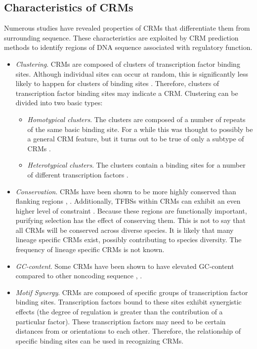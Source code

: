 \documentclass{frontiersENG} %
\begin{document}
\subsection{Characteristics of CRMs}
\label{section:crmcharacteristics}
Numerous studies have revealed properties of CRMs that differentiate
them from surrounding sequence. These characteristics are exploited by
CRM prediction methods to identify regions of DNA sequence associated
with regulatory function.
\begin{itemize}

\item{\textit{Clustering}. CRMs are composed of clusters of
  transcription factor binding sites. Although individual sites can
  occur at random, this is significantly less likely to happen for
  clusters of binding sites \cite{Wagner1999}. Therefore, clusters of
  transcription factor binding sites may indicate a CRM. Clustering
  can be divided into two basic types:
  \begin{itemize}
    \item{\textit{Homotypical clusters}. The clusters are composed of
      a number of repeats of the same basic binding site. For a while
      this was thought to possibly be a general CRM feature, but it
      turns out to be true of only a subtype of CRMs \cite{Li2007}.}
    \item{\textit{Heterotypical clusters}. The clusters contain a
      binding sites for a number of different transcription
      factors \cite{Roth2007}.}
  \end{itemize}
}

\item{\textit{Conservation}. CRMs have been shown to be more highly
  conserved than flanking regions \cite{Kwon2011},
  \cite{Li2007}. Additionally, TFBSs within CRMs can exhibit an even
  higher level of constraint \cite{Kwon2011}. Because these regions
  are functionally important, purifying selection has the effect of
  conserving them. This is not to say that all CRMs will be conserved
  across diverse species. It is likely that many lineage specific CRMs
  exist, possibly contributing to species diversity. The frequency of
  lineage specific CRMs is not known.}

\item{\textit{GC-content}. Some CRMs have been shown to have elevated
  GC-content compared to other noncoding sequence \cite{Li2007},
  \cite{Saxonov2006}.}

\item{\textit{Motif Synergy}. CRMs are composed of specific groups of
  transcription factor binding sites. Transcription factors bound to
  these sites exhibit synergistic effects (the degree of regulation is
  greater than the contribution of a particular factor). These
  transcription factors may need to be certain distances from or
  orientations to each other. Therefore, the relationship of specific
  binding sites can be used in recognizing CRMs.}


\end{itemize}
\end{document}
